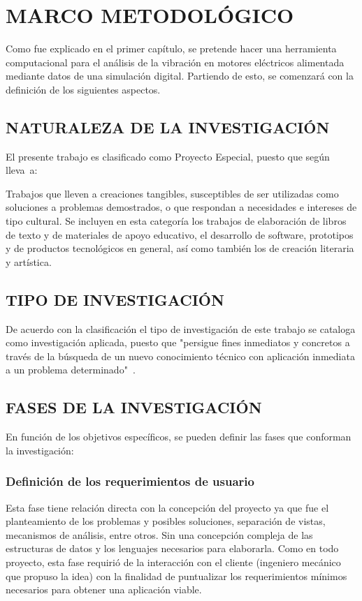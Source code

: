 \thispagestyle{empty}

\section{MARCO METODOLÓGICO}

Como fue explicado en el primer capítulo, se pretende hacer una herramienta
computacional para el análisis de la vibración en motores eléctricos alimentada
mediante datos de una simulación digital. Partiendo de esto, se comenzará
con la definición de los siguientes aspectos.

\subsection{NATURALEZA DE LA INVESTIGACIÓN}

El presente trabajo es clasificado como Proyecto Especial, puesto que según
\textcite{Hernandez} lleva~a:

\begin{center}
    \parbox[ht]{13.5 cm}{Trabajos que lleven a creaciones tangibles,
    susceptibles de ser utilizadas como soluciones a problemas demostrados, o
    que respondan a necesidades e intereses de tipo cultural. Se incluyen en
    esta categoría los trabajos de elaboración de libros de texto y de
    materiales de apoyo educativo, el desarrollo de software, prototipos y de
    productos tecnológicos en general, así como también los de creación
    literaria y artística.}
\end{center}


\subsection{TIPO DE INVESTIGACIÓN}

De acuerdo con la clasificación el tipo de investigación de este trabajo se
cataloga como investigación aplicada, puesto que "persigue fines inmediatos y
concretos a través de la búsqueda de un nuevo conocimiento técnico con aplicación
inmediata a un problema determinado"\ \textcite{Velez}.

\subsection{FASES DE LA INVESTIGACIÓN}

En función de los objetivos específicos, se pueden definir las fases que conforman
la investigación:

\subsubsection{Definición de los requerimientos de usuario}
Esta fase tiene relación directa con la concepción del proyecto ya que fue el
planteamiento de los problemas y posibles soluciones, separación de vistas,
mecanismos de análisis, entre otros. Sin una concepción compleja de las estructuras
de datos y los lenguajes necesarios para elaborarla.
Como en todo proyecto, esta fase requirió de la interacción con el cliente (ingeniero
mecánico que propuso la idea) con la finalidad de puntualizar los requerimientos
mínimos necesarios para obtener una aplicación viable.

